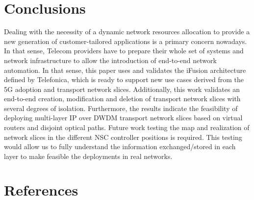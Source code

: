\documentclass[journal,article,submit,moreauthors,pdftex]{Definitions/mdpi}
\begin{document}
\section{Conclusions}
\label{sec:conclusions}

Dealing with the necessity of a dynamic network resources allocation to provide a new generation of customer-tailored applications is a primary concern nowadays. In that sense, Telecom providers have to prepare their whole set of systems and network infrastructure to allow the introduction of end-to-end network automation. In that sense, this paper uses and validates the iFusion architecture defined by Telefonica, which is ready to support new use cases derived from the 5G adoption and transport network slices. Additionally, this work validates an end-to-end creation, modification and deletion of transport network slices with several degrees of isolation. Furthermore, the results indicate the feasibility of deploying multi-layer IP over DWDM transport network slices based on virtual routers and disjoint optical paths.  Future work testing the map and realization of network slices in the different NSC controller positions is required. This testing would allow us to fully understand the information exchanged/stored in each layer to make feasible the deployments in real networks. 






\section{References}

\end{document}
